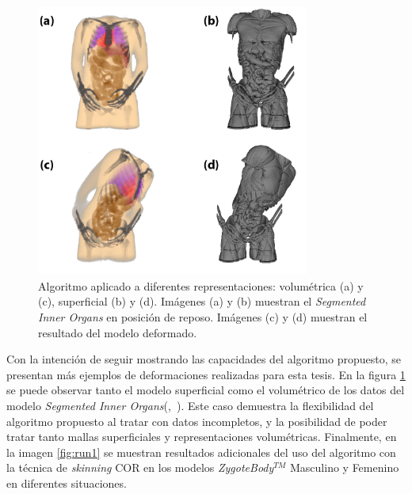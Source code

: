 \begin{figure}[!ht]%
   \centering
   \includegraphics[width=0.8\textwidth]{IMG/HV}
    \caption{Algoritmo aplicado a diferentes representaciones: volumétrica (a) y (c), superficial (b) y (d). Imágenes (a) y (b) muestran el \emph{Segmented Inner Organs} en posición de reposo. Imágenes (c) y (d) muestran el resultado del modelo deformado.}
    \label{fig:humanvisible}
\end{figure}

Con la intención de seguir mostrando las capacidades del algoritmo propuesto, se presentan más ejemplos de deformaciones realizadas para esta tesis. En la figura \ref{fig:humanvisible} se puede observar tanto el modelo superficial como el volumétrico de los datos del modelo \emph{Segmented Inner Organs}(\cite{VM2002},~\cite{VoxelMan}). Este caso demuestra la flexibilidad del algoritmo propuesto al tratar con datos incompletos, y la posibilidad de poder tratar tanto mallas superficiales y representaciones volumétricas.
%
Finalmente, en la imagen \ref{fig:run1} se muestran resultados adicionales del uso del algoritmo con la técnica de \emph{skinning} \ac{COR} en los modelos \emph{ZygoteBody}$^{TM}$ Masculino y Femenino en diferentes situaciones.

